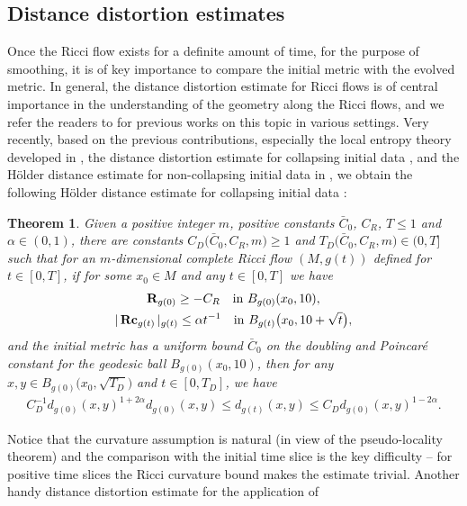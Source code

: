 \documentclass[pdftex]{sigma}
\numberwithin{equation}{section}
\newtheorem{Theorem}{Theorem}[section]
\newcommand{\Rc}{\operatorname{\bf Rc}}
\newcommand{\Sc}{\mathbf{R}}
\begin{document}
\subsection{Distance distortion estimates}\label{section4.3}
Once the Ricci flow exists for a definite amount of time, for the purpose of
smoothing, it is of key importance to compare the initial metric with the
evolved metric. In general, the distance distortion estimate for Ricci flows
is of central importance in the understanding of the geometry along the Ricci
flows, and we refer the readers to \cite{BZ17, BZ19,CW12,CW19,CW14,H95,Foxy1808, TW15} for previous works on this topic in various settings.
Very recently, based on the previous contributions, especially the local
entropy theory developed in \cite{Wang18}, the distance distortion estimate for
collapsing initial data \cite{Foxy1808}, and the H\"older distance estimate for
non-collapsing initial data in \cite{HKRX18}, we obtain the following H\"older
distance estimate for collapsing initial data \cite[Theorem~A.1]{HW20b}:
\begin{Theorem}\label{thm: HW20b2}
Given a positive integer $m$, positive constants $\bar{C}_0$, $C_R$, $T\le 1$
and $\alpha\in (0,1)$, there are constants
$C_D\big(\bar{C}_0,C_R,m\big)\ge 1$ and $T_D\big(\bar{C}_0,C_R,m\big)\in (0,T]$ such that for an
$m$-di\-men\-sio\-nal complete Ricci flow $(M,g(t))$ defined for $t\in [0,T]$, if
for some $x_0\in M$ and any $t\in [0,T]$ we have
\begin{gather*}
\Sc_{g(0)}\ge -C_R\quad \text{in}\ B_{g(0)}(x_0,10),\\ %
 |\Rc_{g(t)} |_{g(t)}\le \alpha t^{-1}\quad \text{in}\
B_{g(t)}\big(x_0,10+\sqrt{t}\big),%
\end{gather*}
and the initial metric has a uniform bound $\bar{C}_0$ on the doubling and
Poincar\'e constant for the geodesic ball $B_{g(0)}(x_0,10)$, then
for any $x,y\in B_{g(0)}\big(x_0,\sqrt{T_D}\big)$ and $t\in [0,T_D]$, we
have
\begin{gather*}
C_D^{-1}d_{g(0)}(x,y)^{1+2\alpha}d_{g(0)}(x,y) \le d_{g(t)}(x,y) \le
C_Dd_{g(0)}(x,y)^{1-2\alpha}.
\end{gather*}
\end{Theorem}
Notice that the curvature assumption is natural (in view of the pseudo-locality
theorem) and the comparison with the initial time slice is the key difficulty
-- for positive time slices the Ricci curvature bound makes the estimate
trivial. Another handy distance distortion estimate for the application of
\end{document}
